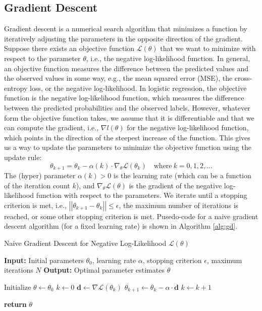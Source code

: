 \documentclass{article}[11pt]
\newcommand{\norm}[1]{\left|\left|#1\right|\right|}
\begin{document}
\subsection{Gradient Descent}
Gradient descent is a numerical search algorithm that minimizes a function by iteratively adjusting the parameters in the opposite direction of the gradient.
Suppose there exists an objective function $\mathcal{L}(\theta)$ that we want to minimize with respect to the parameter $\theta$, i.e., the negative log-likelihood function.
In general, an objective function measures the difference between the predicted values and the observed values in some way, e.g., the mean squared error (MSE), the cross-entropy loss, or the negative log-likelihood.
In logistic regression, the objective function is the negative log-likelihood function, which measures the difference between the predicted probabilities and the observed labels. However, whatever form the objective function takes, we assume that it is differentiable and that we can compute the gradient, i.e., $\nabla{l}(\theta)$ for the negative log-likelihood function, 
which points in the direction of the steepest increase of the function. This gives us a way to update the parameters to minimize the objective function using the update rule:
\begin{equation*}
\theta_{k+1} = \theta_{k} - \alpha(k)\cdot\nabla_{\theta}\mathcal{L}(\theta_{k})\quad\text{where}{~k = 0,1,2,\dots}
\end{equation*}
The (hyper) parameter $\alpha(k)>0$ is the learning rate (which can be a function of the iteration count $k$), and $\nabla_{\theta}\mathcal{L}(\theta)$ is the gradient of the negative log-likelihood function with respect to the parameters.  
We iterate until a stopping criterion is met, i.e., $\norm{\theta_{k+1} - \theta_{k}}\leq\epsilon$, the maximum number of iterations is reached, or some other stopping criterion is met.
Pusedo-code for a naive gradient descent algorithm (for a fixed learning rate) is shown in Algorithm \ref{alg:gd}.
\begin{algorithm}[H]
\caption{Naive Gradient Descent for Negative Log-Likelihood $\mathcal{L}(\theta)$}\label{alg:gd}
\begin{algorithmic}[1]
\State \textbf{Input:} Initial parameters $\theta_0$, learning rate $\alpha$, stopping criterion $\epsilon$, maximum iterations $N$
\State \textbf{Output:} Optimal parameter estimates $\theta$

\State Initialize $\theta \gets \theta_0$
\State $k \gets 0$
    \State $\mathbf{d} \gets \nabla \mathcal{L}(\theta_{k})$
    \State $\theta_{k+1} \gets \theta_{k} - \alpha \cdot \mathbf{d}$
    \State $k \gets k + 1$
\EndWhile

\State \textbf{return} $\theta$
\end{algorithmic}
\end{algorithm}
\end{document}
